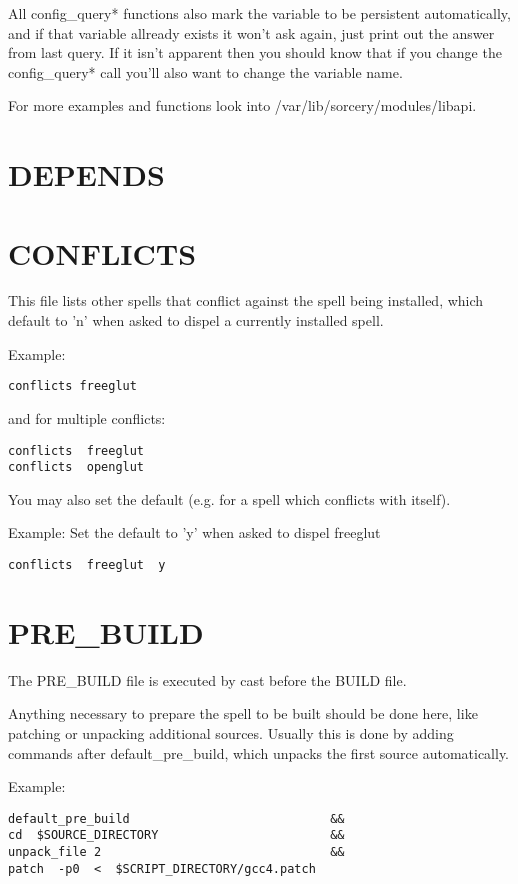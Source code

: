 \documentclass[a4paper,10pt]{book}
\begin{document}
All config\_query* functions also mark the variable to be persistent
automatically, and if that variable allready exists it won't ask again, just
print out the answer from last query. If it isn't apparent then you should know
that if you change the config\_query* call you'll also want to change the
variable name.

For more examples and functions look into /var/lib/sorcery/modules/libapi.

\section{DEPENDS}
\section{CONFLICTS}
This file lists other spells that conflict against the spell being installed,
which default to 'n' when asked to dispel a currently installed spell.

Example:
\begin{verbatim}
conflicts freeglut
\end{verbatim}

and for multiple conflicts:
\begin{verbatim}
conflicts  freeglut
conflicts  openglut
\end{verbatim}

You may also set the default (e.g. for a spell which conflicts with itself).

Example: Set the default to 'y' when asked to dispel freeglut
\begin{verbatim}
conflicts  freeglut  y
\end{verbatim}

\section{PRE\_BUILD}
The PRE\_BUILD file is executed by cast before the BUILD file.

Anything necessary to prepare the spell to be built should be done here, like
patching or unpacking additional sources. Usually this is done by adding
commands after default\_pre\_build, which unpacks the first source
automatically.

Example:
\begin{verbatim}
default_pre_build                            &&
cd  $SOURCE_DIRECTORY                        &&
unpack_file 2                                &&
patch  -p0  <  $SCRIPT_DIRECTORY/gcc4.patch
\end{verbatim}
\end{document}
